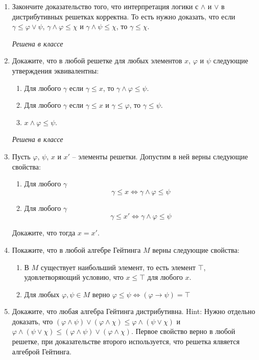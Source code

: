 \begin{enumerate}

\item Закончите доказательство того, что интерпретация логики с $\land$ и $\lor$ в дистрибутивных решетках корректна.
    То есть нужно доказать, что если $\gamma \leq \varphi \lor \psi$, $\gamma \land \varphi \leq \chi$ и $\gamma \land \psi \leq \chi$, то $\gamma \leq \chi$.
    
    \textit{Решена в классе}

\item Докажите, что в любой решетке для любых элементов $x$, $\varphi$ и $\psi$ следующие утверждения эквивалентны:
\begin{enumerate}
\item Для любого $\gamma$ если $\gamma \leq x$, то $\gamma \land \varphi \leq \psi$.
\item Для любого $\gamma$ если $\gamma \leq x$ и $\gamma \leq \varphi$, то $\gamma \leq \psi$.
\item $x \land \varphi \leq \psi$.
\end{enumerate}

\textit{Решена в классе}

\item Пусть $\varphi$, $\psi$, $x$ и $x'$ -- элементы решетки. Допустим в ней верны следующие свойства:
\begin{enumerate}
\item Для любого $\gamma$
    \[ \gamma \leq x \Leftrightarrow \gamma \land \varphi \leq \psi \]
\item Для любого $\gamma$
    \[ \gamma \leq x' \Leftrightarrow \gamma \land \varphi \leq \psi \]
\end{enumerate}
Докажите, что тогда $x = x'$.

\item Покажите, что в любой алгебре Гейтинга $M$ верны следующие свойства:
\begin{enumerate}
\item В $M$ существует наибольший элемент, то есть элемент $\top$, удовлетворяющий условию, что $x \leq \top$ для любого $x$.
\item Для любых $\varphi, \psi \in M$ верно $\varphi \leq \psi \Leftrightarrow (\varphi \to \psi) = \top$
\end{enumerate}

\item Докажите, что любая алгебра Гейтинга дистрибутивна.
    Hint: Нужно отдельно доказать, что
    $(\varphi \land \psi) \lor (\varphi \land \chi) \leq \varphi \land (\psi \lor \chi)$ и
    $\varphi \land (\psi \lor \chi) \leq (\varphi \land \psi) \lor (\varphi \land \chi)$.
    Первое свойство верно в любой решетке, при доказательстве второго используется, что решетка ялвяется алгеброй Гейтинга.


\end{enumerate}
